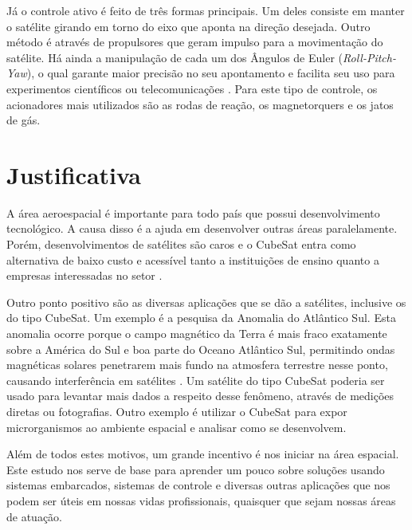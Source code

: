 \documentclass[
	12pt,				%
	openany,			%
	twoside,			%
	a4paper,			%
	english,			%
	french,				%
	spanish,			%
	brazil,				%
	oldfontcommands
	]{abntex2}
\begin{document}
Já o controle ativo é feito de três formas principais. Um deles consiste em manter o satélite girando em torno do eixo que aponta na direção desejada. Outro método é através de propulsores que geram impulso para a movimentação do satélite. Há ainda a manipulação de cada um dos Ângulos de Euler (\textit{Roll-Pitch-Yaw}), o qual garante maior precisão no seu apontamento e facilita seu uso para experimentos científicos ou telecomunicações \cite{FrancLav}. Para este tipo de controle, os acionadores mais utilizados são as rodas de reação, os magnetorquers e os jatos de gás.

\section{Justificativa}

	A área aeroespacial é importante para todo país que possui desenvolvimento tecnológico. A causa disso é a ajuda em desenvolver outras áreas paralelamente. Porém, desenvolvimentos de satélites são caros e o CubeSat entra como alternativa de baixo custo e acessível tanto a instituições de ensino quanto a empresas interessadas no setor \cite{DIY}.
	
Outro ponto positivo são as diversas aplicações que se dão a satélites, inclusive os do tipo CubeSat. Um exemplo é a pesquisa da Anomalia do Atlântico Sul. Esta anomalia ocorre porque o campo magnético da Terra é mais fraco exatamente sobre a América do Sul e boa parte do Oceano Atlântico Sul, permitindo ondas magnéticas solares penetrarem mais fundo na atmosfera terrestre nesse ponto, causando interferência em satélites \cite{MORAES}. Um satélite do tipo CubeSat poderia ser usado para levantar mais dados a respeito desse fenômeno, através de medições diretas ou fotografias. Outro exemplo é utilizar o CubeSat para expor microrganismos ao ambiente espacial e analisar como se desenvolvem.

Além de todos estes motivos, um grande incentivo é nos iniciar na área espacial. Este estudo nos serve de base para aprender um pouco sobre soluções usando sistemas embarcados, sistemas de controle e diversas outras aplicações que nos podem ser úteis em nossas vidas profissionais, quaisquer que sejam nossas áreas de atuação.

\end{document}
